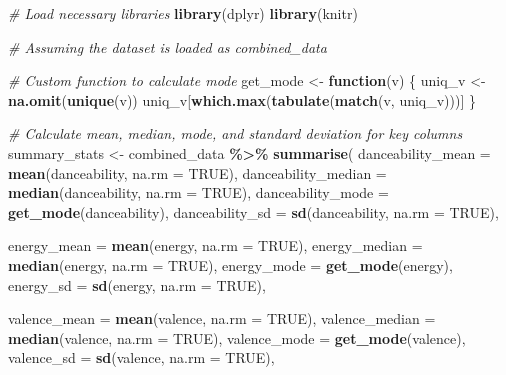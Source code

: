 \documentclass[
]{article}
\newenvironment{Shaded}{\begin{snugshade}}{\end{snugshade}}
\newcommand{\AttributeTok}[1]{\textcolor[rgb]{0.13,0.29,0.53}{#1}}
\newcommand{\CommentTok}[1]{\textcolor[rgb]{0.56,0.35,0.01}{\textit{#1}}}
\newcommand{\ConstantTok}[1]{\textcolor[rgb]{0.56,0.35,0.01}{#1}}
\newcommand{\ControlFlowTok}[1]{\textcolor[rgb]{0.13,0.29,0.53}{\textbf{#1}}}
\newcommand{\FunctionTok}[1]{\textcolor[rgb]{0.13,0.29,0.53}{\textbf{#1}}}
\newcommand{\NormalTok}[1]{#1}
\newcommand{\OtherTok}[1]{\textcolor[rgb]{0.56,0.35,0.01}{#1}}
\newcommand{\SpecialCharTok}[1]{\textcolor[rgb]{0.81,0.36,0.00}{\textbf{#1}}}
\begin{document}
\begin{Shaded}
\begin{Highlighting}[]
\CommentTok{\# Load necessary libraries}
\FunctionTok{library}\NormalTok{(dplyr)}
\FunctionTok{library}\NormalTok{(knitr)}

\CommentTok{\# Assuming the dataset is loaded as \textquotesingle{}combined\_data\textquotesingle{}}

\CommentTok{\# Custom function to calculate mode}
\NormalTok{get\_mode }\OtherTok{\textless{}{-}} \ControlFlowTok{function}\NormalTok{(v) \{}
\NormalTok{  uniq\_v }\OtherTok{\textless{}{-}} \FunctionTok{na.omit}\NormalTok{(}\FunctionTok{unique}\NormalTok{(v))}
\NormalTok{  uniq\_v[}\FunctionTok{which.max}\NormalTok{(}\FunctionTok{tabulate}\NormalTok{(}\FunctionTok{match}\NormalTok{(v, uniq\_v)))]}
\NormalTok{\}}

\CommentTok{\# Calculate mean, median, mode, and standard deviation for key columns}
\NormalTok{summary\_stats }\OtherTok{\textless{}{-}}\NormalTok{ combined\_data }\SpecialCharTok{\%\textgreater{}\%}
  \FunctionTok{summarise}\NormalTok{(}
    \AttributeTok{danceability\_mean =} \FunctionTok{mean}\NormalTok{(danceability, }\AttributeTok{na.rm =} \ConstantTok{TRUE}\NormalTok{),}
    \AttributeTok{danceability\_median =} \FunctionTok{median}\NormalTok{(danceability, }\AttributeTok{na.rm =} \ConstantTok{TRUE}\NormalTok{),}
    \AttributeTok{danceability\_mode =} \FunctionTok{get\_mode}\NormalTok{(danceability),}
    \AttributeTok{danceability\_sd =} \FunctionTok{sd}\NormalTok{(danceability, }\AttributeTok{na.rm =} \ConstantTok{TRUE}\NormalTok{),}
    
    \AttributeTok{energy\_mean =} \FunctionTok{mean}\NormalTok{(energy, }\AttributeTok{na.rm =} \ConstantTok{TRUE}\NormalTok{),}
    \AttributeTok{energy\_median =} \FunctionTok{median}\NormalTok{(energy, }\AttributeTok{na.rm =} \ConstantTok{TRUE}\NormalTok{),}
    \AttributeTok{energy\_mode =} \FunctionTok{get\_mode}\NormalTok{(energy),}
    \AttributeTok{energy\_sd =} \FunctionTok{sd}\NormalTok{(energy, }\AttributeTok{na.rm =} \ConstantTok{TRUE}\NormalTok{),}
    
    \AttributeTok{valence\_mean =} \FunctionTok{mean}\NormalTok{(valence, }\AttributeTok{na.rm =} \ConstantTok{TRUE}\NormalTok{),}
    \AttributeTok{valence\_median =} \FunctionTok{median}\NormalTok{(valence, }\AttributeTok{na.rm =} \ConstantTok{TRUE}\NormalTok{),}
    \AttributeTok{valence\_mode =} \FunctionTok{get\_mode}\NormalTok{(valence),}
    \AttributeTok{valence\_sd =} \FunctionTok{sd}\NormalTok{(valence, }\AttributeTok{na.rm =} \ConstantTok{TRUE}\NormalTok{),}
    

\end{Highlighting}
\end{Shaded}
\end{document}
